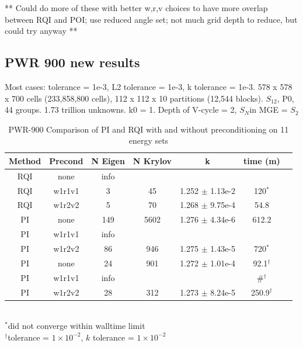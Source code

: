 \documentclass[preprint,12pt]{elsarticle}
\newcommand{\Sn}{\ensuremath{S_N}}
\begin{document}
** Could do more of these with better w,r,v choices to have more overlap between RQI and POI; use reduced angle set; not much grid depth to reduce, but could try anyway **

\subsection{PWR 900 new results}
Most cases: tolerance = 1e-3, L2 tolerance = 1e-3, k tolerance = 1e-3. 578 x 578 x 700 cells (233,858,800 cells), 112 x 112 x 10 partitions (12,544 blocks). $S_{12}$, P0, 44 groups. 1.73 trillion unknowns. k0 = 1. Depth of V-cycle = 2, \Sn  in MGE = $S_2$
%
\begin{table}[!h]
\caption{PWR-900 Comparison of PI and RQI with and without preconditioning on 11 energy sets}
\label{tab:PWR all}
  \begin{center}
    \begin{tabular}{| c | c | c | c | c | c | c |}
      \hline
      Method & Precond & N Eigen & N Krylov & k & time (m) \\\hline
      RQI & none   & info &     &                     & \\
      RQI & w1r1v1 & 3   & 45   & 1.252 $\pm$ 1.13e-2 & 120$^*$ \\
      RQI & w1r2v2 & 5   & 70   & 1.268 $\pm$ 9.75e-4 & 54.8 \\
      PI  & none   & 149 & 5602 & 1.276 $\pm$ 4.34e-6 & 612.2 \\
      PI  & w1r1v1 & info &     &                     & \\
      PI  & w1r2v2 & 86  & 946  & 1.275 $\pm$ 1.43e-5 & 720$^*$ \\
      \hline
      PI  & none   & 24  & 901  & 1.272 $\pm$ 1.01e-4 & 92.1$^\dagger$ \\
      PI  & w1r1v1 & info &     &                     & \#$^\dagger$\\
      PI  & w1r2v2 & 28  & 312  & 1.273 $\pm$ 8.24e-5 & 250.9$^\dagger$ \\
      \hline
    \end{tabular}\\
    $^{*}$did not converge within walltime limit\\
    $^{\dagger}$tolerance = $1 \times 10^{-2}$, $k$ tolerance = $1 \times 10^{-2}$
  \end{center}
\end{table}
\end{document}
